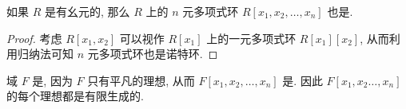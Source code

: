\begin{corollary}
	如果 $R$ 是有幺元的, 那么 $R$ 上的 $n$ 元多项式环 $R[x_1,x_2,\ldots,x_n]$ 也是.
\end{corollary}

\begin{proof}
	考虑 $R[x_1,x_2]$ 可以视作 $R[x_1]$ 上的一元多项式环 $R[x_1][x_2]$, 从而利用归纳法可知 $n$ 元多项式环也是诺特环.
\end{proof}

\begin{proposition}
	域 $F$ 是, 因为 $F$ 只有平凡的理想, 从而 $F[x_1,x_2,\ldots,x_n]$ 是. 因此 $F[x_1,x_2\ldots,x_n]$ 的每个理想都是有限生成的.
\end{proposition}